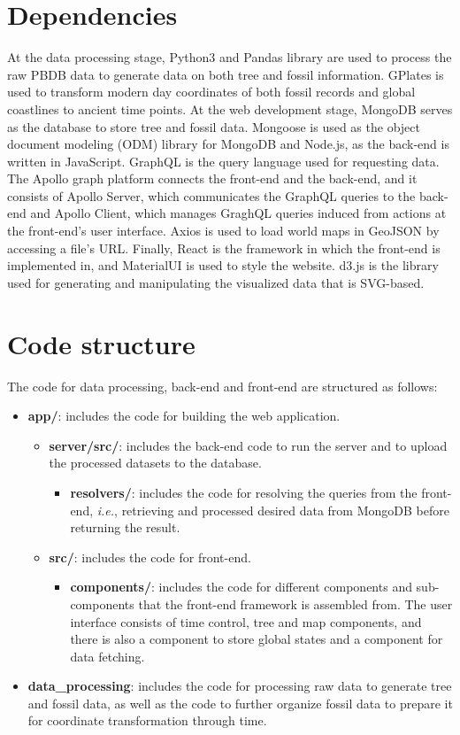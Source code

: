 \documentclass[11pt, a4paper,oneside,chapterprefix=false]{scrbook}
\begin{document}
\section{Dependencies} \label{sec:implementation_dependencies}
At the data processing stage, Python3 and Pandas library are used to process the raw PBDB data to generate data on both tree and fossil information. GPlates is used to transform modern day coordinates of both fossil records and global coastlines to ancient time points. At the web development stage, MongoDB serves as the database to store tree and fossil data. Mongoose is used as the object document modeling (ODM) library for MongoDB and Node.js, as the back-end is written in JavaScript. GraphQL is the query language used for requesting data. The Apollo graph platform connects the front-end and the back-end, and it consists of Apollo Server, which communicates the GraphQL queries to the back-end and Apollo Client, which manages GraghQL queries induced from actions at the front-end's user interface. Axios is used to load world maps in GeoJSON by accessing a file's URL. Finally, React is the framework in which the front-end is implemented in, and MaterialUI is used to style the website. d3.js is the library used for generating and manipulating the visualized data that is SVG-based.
\section{Code structure} \label{sec:implementation_code_structure}
The code for data processing, back-end and front-end are structured as follows: 
\begin{itemize}
	\item \textbf{app/}: includes the code for building the web application.
		\begin{itemize}	
			\item \textbf{server/src/}: includes the back-end code to run the server and to upload the processed datasets to the database.
				\begin{itemize}	
					\item \textbf{resolvers/}: includes the code for resolving the queries from the front-end, \textit{i.e.}, retrieving and processed desired data from MongoDB before returning the result.
				\end{itemize}
			\item \textbf{src/}: includes the code for front-end.
				\begin{itemize}	
					\item \textbf{components/}: includes the code for different components and sub-components that the front-end framework is assembled from. The user interface consists of time control, tree and map components, and there is also a component to store global states and a component for data fetching.
				\end{itemize}
		\end{itemize}
		
	\item \textbf{data\_processing}: includes the code for processing raw data to generate tree and fossil data, as well as the code to further organize fossil data to prepare it for coordinate transformation through time.
\end{itemize}
\newpage
\end{document}
